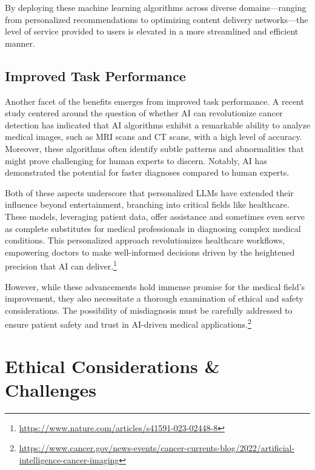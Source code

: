 \documentclass[
]{book}
\begin{document}
By deploying these machine learning algorithms across diverse domains---ranging from personalized recommendations to optimizing content delivery networks---the level of service provided to users is elevated in a more streamlined and efficient manner.

\hypertarget{improved-task-performance}{%
\subsection{Improved Task Performance}\label{improved-task-performance}}

Another facet of the benefits emerges from improved task performance. A recent study centered around the question of whether AI can revolutionize cancer detection has indicated that AI algorithms exhibit a remarkable ability to analyze medical images, such as MRI scans and CT scans, with a high level of accuracy. Moreover, these algorithms often identify subtle patterns and abnormalities that might prove challenging for human experts to discern. Notably, AI has demonstrated the potential for faster diagnoses compared to human experts.

Both of these aspects underscore that personalized LLMs have extended their influence beyond entertainment, branching into critical fields like healthcare. These models, leveraging patient data, offer assistance and sometimes even serve as complete substitutes for medical professionals in diagnosing complex medical conditions. This personalized approach revolutionizes healthcare workflows, empowering doctors to make well-informed decisions driven by the heightened precision that AI can deliver.\footnote{\url{https://www.nature.com/articles/s41591-023-02448-8}}

However, while these advancements hold immense promise for the medical field's improvement, they also necessitate a thorough examination of ethical and safety considerations. The possibility of misdiagnosis must be carefully addressed to ensure patient safety and trust in AI-driven medical applications.\footnote{\url{https://www.cancer.gov/news-events/cancer-currents-blog/2022/artificial-intelligence-cancer-imaging}}

\hypertarget{ethical-considerations-challenges}{%
\section{Ethical Considerations \& Challenges}\label{ethical-considerations-challenges}}
\end{document}
